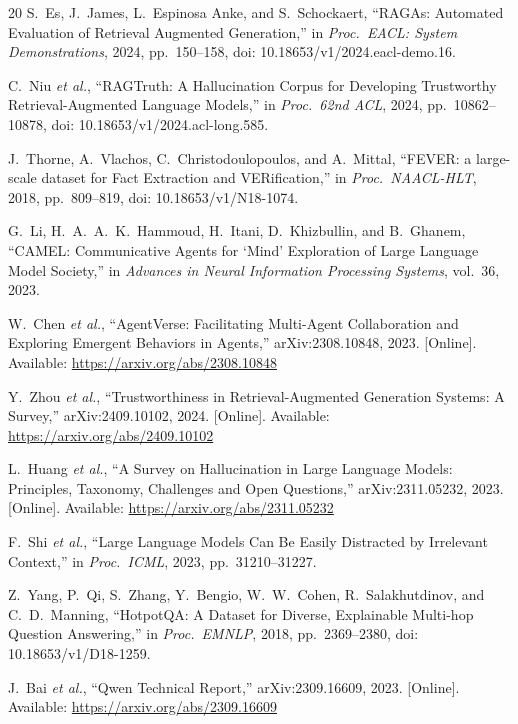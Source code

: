 \documentclass[conference]{IEEEtran}
\begin{document}
\begin{thebibliography}{20}
S.~Es, J.~James, L.~Espinosa Anke, and S.~Schockaert, ``RAGAs: Automated
Evaluation of Retrieval Augmented Generation,'' in \emph{Proc.\ EACL:
System Demonstrations}, 2024, pp.~150--158,
doi: 10.18653/v1/2024.eacl-demo.16.

C.~Niu \emph{et al.}, ``RAGTruth: A Hallucination Corpus for Developing
Trustworthy Retrieval-Augmented Language Models,'' in \emph{Proc.\ 62nd ACL},
2024, pp.~10862--10878, doi: 10.18653/v1/2024.acl-long.585.

J.~Thorne, A.~Vlachos, C.~Christodoulopoulos, and A.~Mittal, ``FEVER: a large-scale
dataset for Fact Extraction and VERification,'' in \emph{Proc.\ NAACL-HLT}, 2018,
pp.~809--819, doi: 10.18653/v1/N18-1074.

G.~Li, H.~A.~A.~K.~Hammoud, H.~Itani, D.~Khizbullin, and B.~Ghanem,
``CAMEL: Communicative Agents for `Mind' Exploration of Large Language Model
Society,'' in \emph{Advances in Neural Information Processing Systems},
vol.~36, 2023.

W.~Chen \emph{et al.}, ``AgentVerse: Facilitating Multi-Agent Collaboration
and Exploring Emergent Behaviors in Agents,'' arXiv:2308.10848, 2023.
[Online]. Available: \url{https://arxiv.org/abs/2308.10848}

Y.~Zhou \emph{et al.}, ``Trustworthiness in Retrieval-Augmented Generation
Systems: A Survey,'' arXiv:2409.10102, 2024. [Online]. Available:
\url{https://arxiv.org/abs/2409.10102}

L.~Huang \emph{et al.}, ``A Survey on Hallucination in Large Language Models:
Principles, Taxonomy, Challenges and Open Questions,'' arXiv:2311.05232, 2023.
[Online]. Available: \url{https://arxiv.org/abs/2311.05232}

F.~Shi \emph{et al.}, ``Large Language Models Can Be Easily Distracted by
Irrelevant Context,'' in \emph{Proc.\ ICML}, 2023, pp.~31210--31227.

Z.~Yang, P.~Qi, S.~Zhang, Y.~Bengio, W.~W.~Cohen, R.~Salakhutdinov, and
C.~D.~Manning, ``HotpotQA: A Dataset for Diverse, Explainable Multi-hop
Question Answering,'' in \emph{Proc.\ EMNLP}, 2018, pp.~2369--2380,
doi: 10.18653/v1/D18-1259.

J.~Bai \emph{et al.}, ``Qwen Technical Report,'' arXiv:2309.16609, 2023.
[Online]. Available: \url{https://arxiv.org/abs/2309.16609}

\end{thebibliography}
\end{document}

